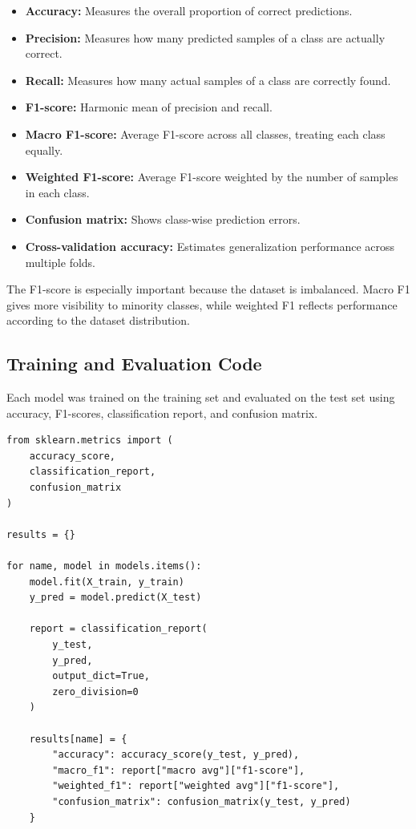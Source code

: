 \documentclass[12pt,a4paper]{article}
\begin{document}
\begin{itemize}
    \item \textbf{Accuracy:} Measures the overall proportion of correct predictions.
    \item \textbf{Precision:} Measures how many predicted samples of a class are actually correct.
    \item \textbf{Recall:} Measures how many actual samples of a class are correctly found.
    \item \textbf{F1-score:} Harmonic mean of precision and recall.
    \item \textbf{Macro F1-score:} Average F1-score across all classes, treating each class equally.
    \item \textbf{Weighted F1-score:} Average F1-score weighted by the number of samples in each class.
    \item \textbf{Confusion matrix:} Shows class-wise prediction errors.
    \item \textbf{Cross-validation accuracy:} Estimates generalization performance across multiple folds.
\end{itemize}

The F1-score is especially important because the dataset is imbalanced. Macro F1 gives more visibility to minority classes, while weighted F1 reflects performance according to the dataset distribution.

\subsection{Training and Evaluation Code}

Each model was trained on the training set and evaluated on the test set using accuracy, F1-scores, classification report, and confusion matrix.

\begin{lstlisting}
from sklearn.metrics import (
    accuracy_score,
    classification_report,
    confusion_matrix
)

results = {}

for name, model in models.items():
    model.fit(X_train, y_train)
    y_pred = model.predict(X_test)

    report = classification_report(
        y_test,
        y_pred,
        output_dict=True,
        zero_division=0
    )

    results[name] = {
        "accuracy": accuracy_score(y_test, y_pred),
        "macro_f1": report["macro avg"]["f1-score"],
        "weighted_f1": report["weighted avg"]["f1-score"],
        "confusion_matrix": confusion_matrix(y_test, y_pred)
    }
\end{lstlisting}
\end{document}
